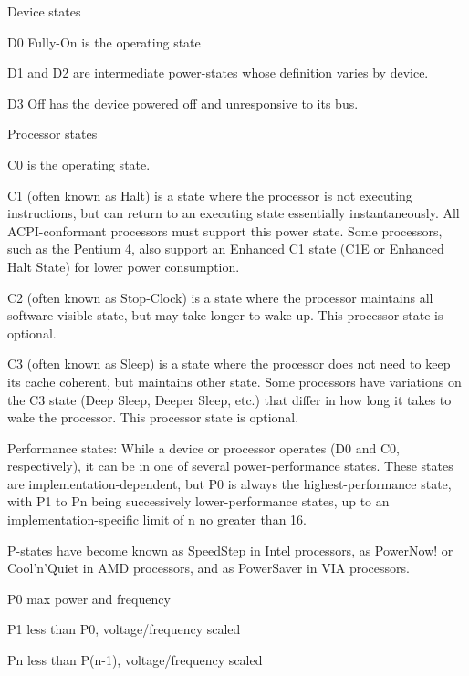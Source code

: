{
\bi
\item Device states
	\bi
	\item D0 Fully-On is the operating state
	\item D1 and D2 are intermediate power-states whose definition varies by device.
	\item D3 Off has the device powered off and unresponsive to its bus.
	\ei
\item Processor states
	\bi
	\item C0 is the operating state.
	\item C1 (often known as Halt) is a state where the processor is not executing instructions, but can return to an executing state essentially instantaneously. All ACPI-conformant processors must support this power state. Some processors, such as the Pentium 4, also support an Enhanced C1 state (C1E or Enhanced Halt State) for lower power consumption.
	\item C2 (often known as Stop-Clock) is a state where the processor maintains all software-visible state, but may take longer to wake up. This processor state is optional.
	\item C3 (often known as Sleep) is a state where the processor does not need to keep its cache coherent, but maintains other state. Some processors have variations on the C3 state (Deep Sleep, Deeper Sleep, etc.) that differ in how long it takes to wake the processor. This processor state is optional.
	\ei
\item Performance states: While a device or processor operates (D0 and C0, respectively), it can be in one of several power-performance states. These states are implementation-dependent, but P0 is always the highest-performance state, with P1 to Pn being successively lower-performance states, up to an implementation-specific limit of n  no greater than 16.
\item[] P-states have become known as SpeedStep  in Intel processors, as PowerNow! or Cool'n'Quiet in AMD processors, and as PowerSaver in VIA processors.
\bi
\item P0 max power and frequency
\item P1 less than P0, voltage/frequency scaled
\item Pn less than P(n-1), voltage/frequency scaled
\ei
\ei
}

